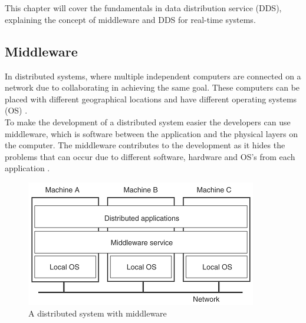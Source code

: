 \documentclass[Main]{subfiles}
\begin{document}
\chapter{}
This chapter will cover the fundamentals in data distribution service (DDS), explaining the concept of middleware and DDS for real-time systems.
\section{Middleware}
In distributed systems, where multiple independent computers are connected on a network due to collaborating in achieving the same goal. These computers can be placed with different geographical locations and have different operating systems (OS) \cite[p. 2]{Tanenbaum}.
\\ To make the development of a distributed system easier the developers can use middleware, which is software between the application and the physical layers on the computer. The middleware contributes to the development as it hides the problems that can occur due to different software, hardware and OS's from each application \cite[p. 3]{Tanenbaum}.

\begin{figure}[hbtp]
\centering
\includegraphics[scale=1]{Figure/Middleware.png}
\caption{A distributed system with middleware \cite[p. 3]{Tanenbaum}}
\label{Fig:Middleware}
\end{figure}
\end{document}

